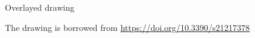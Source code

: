 \begin{frame}{Overlayed drawing}
\begin{minipage}[t]{0.99\linewidth}
\begin{centering}
\begin{figure}
\end{figure}
\end{centering}
\end{minipage}
The drawing is borrowed from \href{https://doi.org/10.3390/s21217378}{https://doi.org/10.3390/s21217378}
\end{frame}
